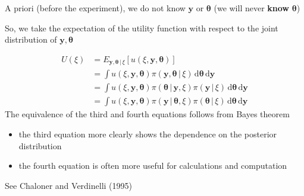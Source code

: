 \documentclass[
  ignorenonframetext,
]{beamer}
\providecommand{\tightlist}{%
  \setlength{\itemsep}{0pt}\setlength{\parskip}{0pt}}
\begin{document}
\begin{frame}{}
\protect\hypertarget{section-29}{}
A priori (before the experiment), we do not know \(\boldsymbol{y}\) or
\(\boldsymbol{\theta}\) (we will never \textbf{know}
\(\boldsymbol{\theta}\))

So, we take the expectation of the utility function with respect to the
joint distribution of \(\boldsymbol{y},\boldsymbol{\theta}\)

\[
\begin{split}
U(\xi) & = E_{\boldsymbol{y},\boldsymbol{\theta}\,|\,\xi}\left[u(\xi,\boldsymbol{y},\boldsymbol{\theta})\right]\\
& = \int u(\xi,\boldsymbol{y},\boldsymbol{\theta})\pi(\boldsymbol{y},\boldsymbol{\theta}\,|\,\xi)\,\mathrm{d}\boldsymbol{\theta}\,\mathrm{d}\boldsymbol{y}\\
& = \int u(\xi, \boldsymbol{y}, \boldsymbol{\theta})\pi(\boldsymbol{\theta}\,|\,\boldsymbol{y},\xi)\pi(\boldsymbol{y}\,|\,\xi)\,\mathrm{d}\boldsymbol{\theta}\,\mathrm{d}\boldsymbol{y}\\
& = \int u(\xi, \boldsymbol{y}, \boldsymbol{\theta})\pi(\boldsymbol{y}\,|\,\boldsymbol{\theta},\xi)\pi(\boldsymbol{\theta}\,|\,\xi)\,\mathrm{d}\boldsymbol{\theta}\,\mathrm{d}\boldsymbol{y}
\end{split}
\] The equivalence of the third and fourth equations follows from Bayes
theorem

\begin{itemize}
\tightlist
\item
  the third equation more clearly shows the dependence on the posterior
  distribution
\item
  the fourth equation is often more useful for calculations and
  computation
\end{itemize}

See Chaloner and Verdinelli (1995)
\end{frame}
\end{document}
